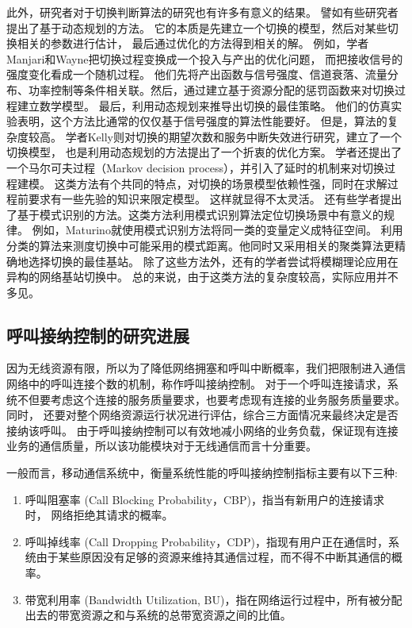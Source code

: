 此外，研究者对于切换判断算法的研究也有许多有意义的结果。
譬如有些研究者提出了基于动态规划的方法。
它的本质是先建立一个切换的模型，然后对某些切换相关的参数进行估计，
最后通过优化的方法得到相关的解。
例如，学者Manjari和Wayne把切换过程变换成一个投入与产出的优化问题，
而把接收信号的强度变化看成一个随机过程\cite{513159}。
他们先将产出函数与信号强度、信道衰落、流量分布、功率控制等条件相关联。然后，通过建立基于资源分配的惩罚函数来对切换过程建立数学模型。
最后，利用动态规划来推导出切换的最佳策略。
他们的仿真实验表明，这个方法比通常的仅仅基于信号强度的算法性能要好。
但是，算法的复杂度较高。
学者Kelly则对切换的期望次数和服务中断失效进行研究，建立了一个切换模型，
也是利用动态规划的方法提出了一个折衷的优化方案\cite{618185}。
学者还提出了一个马尔可夫过程（Markov decision process），并引入了延时的机制来对切换过程建模\cite{504996}。
这类方法有个共同的特点，对切换的场景模型依赖性强，同时在求解过程前要求有一些先验的知识来限定模型。
这样就显得不太灵活。
还有些学者提出了基于模式识别的方法。这类方法利用模式识别算法定位切换场景中有意义的规律。
例如，Maturino就使用模式识别方法将同一类的变量定义成特征空间\cite{345157}。
利用分类的算法来测度切换中可能采用的模式距离。他同时又采用相关的聚类算法更精确地选择切换的最佳基站。
除了这些方法外，还有的学者尝试将模糊理论应用在异构的网络基站切换中\cite{5189770}\cite{5672711}。
总的来说，由于这类方法的复杂度较高，实际应用并不多见。

\subsection{呼叫接纳控制的研究进展}
因为无线资源有限，所以为了降低网络拥塞和呼叫中断概率，我们把限制进入通信网络中的呼叫连接个数的机制，称作呼叫接纳控制。
对于一个呼叫连接请求，系统不但要考虑这个连接的服务质量要求，也要考虑现有连接的业务服务质量要求。同时，
还要对整个网络资源运行状况进行评估，综合三方面情况来最终决定是否接纳该呼叫\cite{Ahmed2005}\cite{Ghaderi_Boutaba_2006}。
由于呼叫接纳控制可以有效地减小网络的业务负载，保证现有连接业务的通信质量，所以该功能模块对于无线通信而言十分重要。

一般而言，移动通信系统中，衡量系统性能的呼叫接纳控制指标主要有以下三种:
\begin{enumerate}[(1)]
\item 呼叫阻塞率  (Call Blocking Probability，CBP)，指当有新用户的连接请求时， 网络拒绝其请求的概率。
\item 呼叫掉线率  (Call Dropping Probability，CDP)，指现有用户正在通信时，系统由于某些原因没有足够的资源来维持其通信过程，而不得不中断其通信的概率。
\item 带宽利用率 (Bandwidth Utilization, BU)，指在网络运行过程中，所有被分配出去的带宽资源之和与系统的总带宽资源之间的比值。
\end{enumerate}

